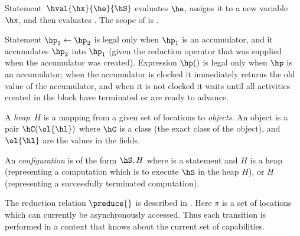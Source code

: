 Statement~$\hval{\hx}{\he}{\hS}$ evaluates $\he$, assigns it to a
new variable $\hx$, and then evaluates \hS. The scope of \hx{} is \hS.

Statement $\hp_1 \leftarrow \hp_2$ is legal only when $\hp_1$ is an accumulator,
    and it accumulates $\hp_2$ into $\hp_1$ (given the reduction operator that was supplied when the accumulator was created).
Expression $\hp()$ is legal only when $\hp$ is an accumulator;
    when the accumulator is clocked it immediately returns the old value of the accumulator,
    and when it is not clocked it waits until all activities created in the block have terminated or are ready to advance.


A {\em heap}~$H$ is a mapping from a given set of locations to {\em
  objects}. An object is a pair $\hC(\ol{\hl})$ where $\hC$ is a class (the exact
class of the object), and $\ol{\hl}$ are the values in the fields.

An {\em configuration} is of the form
$\hS,H$ where \hS{} is a statement and $H$ is a heap (representing a
computation which is to execute $\hS$ in the heap $H$), or $H$
(representing a successfully terminated computation).

The reduction relation $\preduce{}$ is described in
    .
Here $\pi$ is a
set of locations which can currently be asynchronously accessed.  Thus
each transition is performed in a context that knows about the current
set of capabilities.

